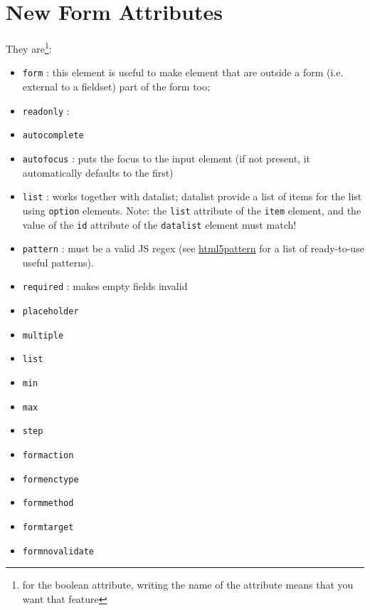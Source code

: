\documentclass[a4paper,11pt]{book}
\begin{document}
\section{New Form Attributes}
They are\footnote{for the boolean attribute, writing the name of the attribute means
	that you want that feature}:
\begin{itemize}
\item \texttt{form} : this element is useful to make element that are outside
	a form (i.e. external to a fieldset) part of the form too;
\item \texttt{readonly} : 
\item \texttt{autocomplete}
\item \texttt{autofocus} : puts the focus to the input element
	(if not present, it automatically defaults to the first)
\item \texttt{list} :  works together with datalist; datalist provide a list of items
	for the list using \texttt{option} elements. Note: the \texttt{list} attribute
	of the \texttt{item} element, and the value of the \texttt{id} attribute of the
	\texttt{datalist} element must match!
\item \texttt{pattern} : must be a valid JS regex (see
\href{http://www.html5pattern.com}{html5pattern}
for a list of ready-to-use useful patterns).
\item \texttt{required} : makes empty fields invalid
\item \texttt{placeholder}
\item \texttt{multiple}
\item \texttt{list}
\item \texttt{min}
\item \texttt{max}
\item \texttt{step}
\item \texttt{formaction}
\item \texttt{formenctype}
\item \texttt{formmethod}
\item \texttt{formtarget}
\item \texttt{formnovalidate}
\end{itemize}
\end{document}
